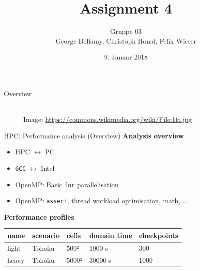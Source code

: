 \documentclass[shortpres,usenames,dvipsnames]{beamer}
\title[{Tsunami simulation}]{Assignment 4}
\author[Bellamy, Honal, Wieser]{Gruppe 03\\George Bellamy, Christoph Honal, Felix Wieser\\\vspace{10pt}{\small Bachelorpraktikum}}
\institute[TU M\"unchen]{Technical University of Munich}
\date{9. Januar 2018}
\begin{document}
		\maketitle
		
\begin{frame}{Overview}
	\begin{figure}
		\hspace{20pt}
		\hspace{40pt}\vspace{10pt}\\
		\vfill
		\flushleft
		{\fontsize{5}{5} \selectfont *Image: \url{https://commons.wikimedia.org/wiki/File:1tt.jpg}}
	\end{figure}
\end{frame}

\begin{frame}[fragile]{HPC: Performance analysis (Overview)}
	\textbf{Analysis overview}
	\begin{itemize}
		\item HPC $\leftrightarrow$ PC
		\item \verb|GCC| $\leftrightarrow$ Intel
		\item OpenMP: Basic \verb|for| parallelisation
		\item OpenMP: \verb|assert|, thread workload optimisation, math, \dots
	\end{itemize}
	
	\vspace{10pt}
	\textbf{Performance profiles}\\
	\begin{tabular}{lllll}
		name & scenario & cells & domain time & checkpoints\\
		\hline
		light & Tohoku & 500² & 1000 s & 300\\
		heavy & Tohoku & 5000² & 30000 s & 1000\\
	\end{tabular}
\end{frame}
\end{document}
